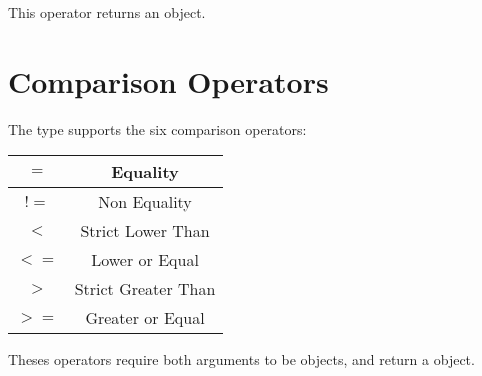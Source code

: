 This operator returns an  object.




\section{Comparison Operators}

The  type supports the six comparison operators:

\begin{tabular}{|c|c|}
\hline
$=$ & Equality \\
\hline
$!=$ & Non Equality \\
\hline
$<$  & Strict Lower Than \\
\hline
$<=$  & Lower or Equal \\
\hline
$>$  & Strict Greater Than \\
\hline
$>=$  & Greater or Equal \\
\hline
\end{tabular}

Theses operators require both arguments to be  objects, and return a  object.
